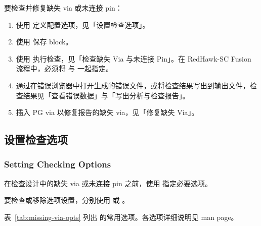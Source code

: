 要检查并修复缺失 via 或未连接 pin：
\begin{enumerate}
  \item 使用  定义配置选项，见「设置检查选项」。
  \item 使用  保存 block。
  \item 使用   执行检查，见「检查缺失 Via 与未连接 Pin」。在 RedHawk-SC Fusion 流程中，必须将  与  一起指定。
  \item 通过在错误浏览器中打开生成的错误文件，或将检查结果写出到输出文件，检查结果见「查看错误数据」与「写出分析与检查报告」。
  \item 插入 PG via 以修复报告的缺失 via，见「修复缺失 Via」。
\end{enumerate}

\subsection{设置检查选项}
\subsubsection*{Setting Checking Options}

在检查设计中的缺失 via 或未连接 pin 之前，使用  指定必要选项。

要检查或移除选项设置，分别使用  或 。

表~\ref{tab:missing-via-opts} 列出  的常用选项。各选项详细说明见 man page。

